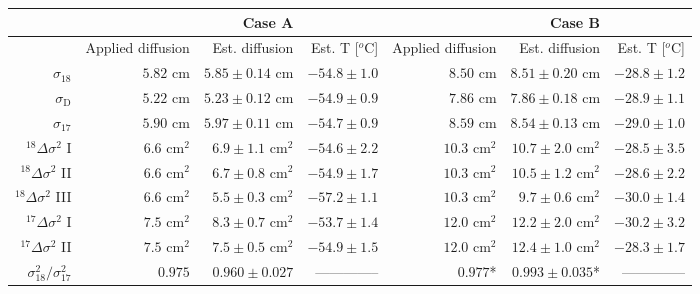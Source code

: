 \documentclass[11pt, draftcls, onecolumn]{IEEEtran} %
\numberwithin{equation}{section}
\numberwithin{table}{section}
\numberwithin{figure}{section}
\begin{document}
\begin{table}[]
	\center
	\begin{tabular}{r r r r r r r } 
		\toprule
		& &  Case A & &  & Case B&\\
		\midrule
		 &	Applied diffusion  &	Est. diffusion & Est. T [$^o\mathrm{C}$] &	
		Applied diffusion	&	Est. diffusion 	& Est. T  [$^o\mathrm{C}$]\\
		\midrule
		$\sigma_{18}$	&	 $5.82$	 $\mathrm{cm}$&	$ 5.85\pm 0.14$ $\mathrm{cm}$	 &  $  -54.8 \pm 1.0 $ 	&	$8.50$  $\mathrm{cm}$&	$ 8.51 \pm 0.20$ $\mathrm{cm}$	& $ -28.8 \pm 1.2 $\\ 
	
	
		$\sigma_{\mathrm{D}}$&	$5.22$ $\mathrm{cm}$	&$ 5.23 \pm 0.12 $ $\mathrm{cm}$	 &	$-54.9  \pm 0.9 $ &	$ 7.86$	 $\mathrm{cm}$&	$7.86 \pm 0.18 $	$\mathrm{cm}$& 	$ -28.9\pm 1.1 $\\ 
	
	
		$\sigma_{17}$&	$5.90$ $\mathrm{cm}$	&$5.97 \pm 0.11 $ $\mathrm{cm}$	 &	$ -54.7 \pm 0.9$ &	$ 8.59$	 $\mathrm{cm}$&	$8.54 \pm 0.13 $	$\mathrm{cm}$& 	$-29.0 \pm 1.0 $\\ 	
	
	
		${}^{18}\Delta\sigma^2$  I &$ 6.6	$ $\mathrm{cm^2}$&	$ 6.9\pm 1.1 $ $\mathrm{cm^2}$	& $ -54.6 \pm 2.2$   &	$10.3$  $\mathrm{cm^2}$	&	$10.7 \pm 2.0$ $\mathrm{cm^2}$	&$ -28.5 \pm 3.5 $\\
	
	
		${}^{18}\Delta\sigma^2$  II& $6.6$ $\mathrm{cm^2}$	&	$6.7 \pm 0.8$ $\mathrm{cm^2}$	& $ -54.9 \pm 1.7$	&	$ 10.3$ $\mathrm{cm^2}$	&$10.5 \pm 1.2 $	 $\mathrm{cm^2}$& $-28.6 \pm 2.2$\\
	
	
		${}^{18}\Delta\sigma^2$  III& $6.6$ $\mathrm{cm^2}$	&	$5.5 \pm 0.3$ $\mathrm{cm^2}$		&  $-57.2  \pm 1.1$	&	$10.3$	 $\mathrm{cm^2}$&	 $9.7 \pm 0.6 $  $\mathrm{cm^2}$& $-30.0 \pm 1.4 $\\
	
	
		${}^{17}\Delta\sigma^2$  I &$ 7.5	$ $\mathrm{cm^2}$&	$ 8.3 \pm 0.7 $ $\mathrm{cm^2}$	& $-53.7  \pm 1.4$   &	$12.0$  $\mathrm{cm^2}$	&	$ 12.2\pm 2.0 $ $\mathrm{cm^2}$	&$-30.2 \pm 3.2$\\
	
	
		${}^{17}\Delta\sigma^2$  II& $7.5$ $\mathrm{cm^2}$	&	$7.5 \pm 0.5$ $\mathrm{cm^2}$	& $-54.9  \pm 1.5 $	&	$12.0$ $\mathrm{cm^2}$	&$ 12.4\pm 1.0$	 $\mathrm{cm^2}$& $-28.3 \pm 1.7 $\\
	
	
		$\sigma^2_{18}/\sigma^2_{17} $&$	0.975$& $ 0.960\pm 0.027 $ 	& --------------	&$0.977$*	& 	$0.993 \pm 0.035$* 	& -------------- \\
	

\end{tabular}
\end{table}
\end{document}
